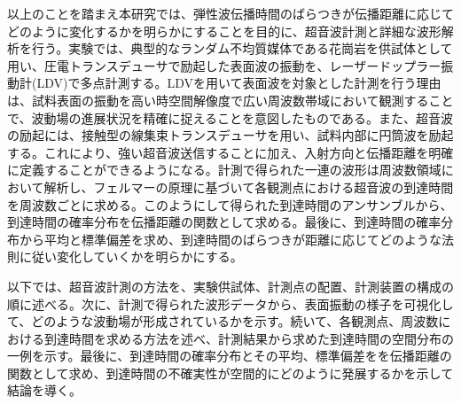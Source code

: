 以上のことを踏まえ本研究では、弾性波伝播時間のばらつきが伝播距離に応じてどのように変化するかを明らかにすることを目的に、超音波計測と詳細な波形解析を行う。実験では、典型的なランダム不均質媒体である花崗岩を供試体として用い、圧電トランスデューサで励起した表面波の振動を、レーザードップラー振動計(LDV)で多点計測する。LDVを用いて表面波を対象とした計測を行う理由は、試料表面の振動を高い時空間解像度で広い周波数帯域において観測することで、波動場の進展状況を精確に捉えることを意図したものである。また、超音波の励起には、接触型の線集束トランスデューサを用い、試料内部に円筒波を励起する。これにより、強い超音波送信することに加え、入射方向と伝播距離を明確に定義することができるようになる。計測で得られた一連の波形は周波数領域において解析し、フェルマーの原理に基づいて各観測点における超音波の到達時間を周波数ごとに求める。このようにして得られた到達時間のアンサンブルから、到達時間の確率分布を伝播距離の関数として求める。最後に、到達時間の確率分布から平均と標準偏差を求め、到達時間のばらつきが距離に応じてどのような法則に従い変化していくかを明らかにする。

以下では、超音波計測の方法を、実験供試体、計測点の配置、計測装置の構成の順に述べる。次に、計測で得られた波形データから、表面振動の様子を可視化して、どのような波動場が形成されているかを示す。続いて、各観測点、周波数における到達時間を求める方法を述べ、計測結果から求めた到達時間の空間分布の一例を示す。最後に、到達時間の確率分布とその平均、標準偏差をを伝播距離の関数として求め、到達時間の不確実性が空間的にどのように発展するかを示して結論を導く。
